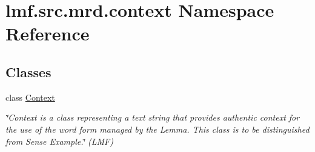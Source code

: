 \hypertarget{namespacelmf_1_1src_1_1mrd_1_1context}{\section{lmf.\+src.\+mrd.\+context Namespace Reference}
\label{namespacelmf_1_1src_1_1mrd_1_1context}
}
\subsection*{Classes}
\begin{DoxyCompactItemize}
\item 
class \hyperlink{classlmf_1_1src_1_1mrd_1_1context_1_1_context}{Context}
\begin{DoxyCompactList}\small\item\em \char`\"{}\+Context is a class representing a text string that provides authentic context for the use of the word form managed by the Lemma. This class is to be distinguished from Sense Example.\char`\"{} (L\+M\+F) \end{DoxyCompactList}\end{DoxyCompactItemize}
